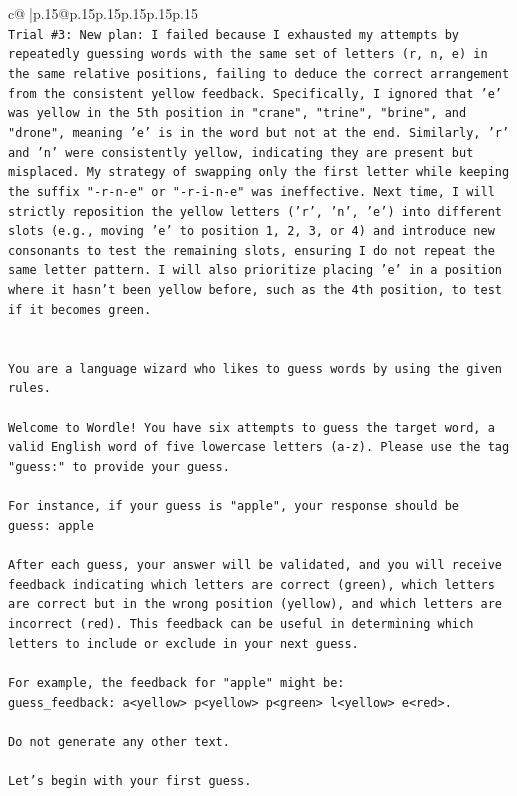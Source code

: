 \documentclass{article}
\begin{document}
{\begin{supertabular}{c@{$\;$}|p{.15\linewidth}@{}p{.15\linewidth}p{.15\linewidth}p{.15\linewidth}p{.15\linewidth}p{.15\linewidth}}
{{{\\ 
\texttt{Trial \#3: New plan: I failed because I exhausted my attempts by repeatedly guessing words with the same set of letters (r, n, e) in the same relative positions, failing to deduce the correct arrangement from the consistent yellow feedback. Specifically, I ignored that 'e' was yellow in the 5th position in "crane", "trine", "brine", and "drone", meaning 'e' is in the word but not at the end. Similarly, 'r' and 'n' were consistently yellow, indicating they are present but misplaced. My strategy of swapping only the first letter while keeping the suffix "{-}r{-}n{-}e" or "{-}r{-}i{-}n{-}e" was ineffective. Next time, I will strictly reposition the yellow letters ('r', 'n', 'e') into different slots (e.g., moving 'e' to position 1, 2, 3, or 4) and introduce new consonants to test the remaining slots, ensuring I do not repeat the same letter pattern. I will also prioritize placing 'e' in a position where it hasn't been yellow before, such as the 4th position, to test if it becomes green.} \\
\\ 
\\ 
\texttt{You are a language wizard who likes to guess words by using the given rules.} \\
\\ 
\texttt{Welcome to Wordle! You have six attempts to guess the target word, a valid English word of five lowercase letters (a{-}z). Please use the tag "guess:" to provide your guess.} \\
\\ 
\texttt{For instance, if your guess is "apple", your response should be} \\
\texttt{guess: apple} \\
\\ 
\texttt{After each guess, your answer will be validated, and you will receive feedback indicating which letters are correct (green), which letters are correct but in the wrong position (yellow), and which letters are incorrect (red). This feedback can be useful in determining which letters to include or exclude in your next guess.} \\
\\ 
\texttt{For example, the feedback for "apple" might be:} \\
\texttt{guess\_feedback: a<yellow> p<yellow> p<green> l<yellow> e<red>.} \\
\\ 
\texttt{Do not generate any other text.} \\
\\ 
\texttt{Let's begin with your first guess.} \\
            }
        }
    }
     \\ \\


\end{supertabular}}
\end{document}
